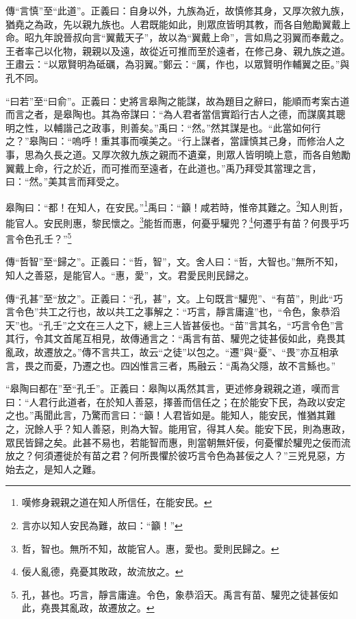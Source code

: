 {\noindent\zhuan{}\fzbyks 傳“言慎”至“此道”。正義曰：自身以外，九族為近，故慎修其身，又厚次敘九族，猶堯之為政，先以親九族也。人君既能如此，則眾庶皆明其教，而各自勉勵翼戴上命。昭九年說晉叔向言“翼戴天子”，故以為“翼戴上命”，言如鳥之羽翼而奉戴之。王者率己以化物，親親以及遠，故從近可推而至於遠者，在修己身、親九族之道。王肅云：“以眾賢明為砥礪，為羽翼。”鄭云：“厲，作也，以眾賢明作輔翼之臣。”與孔不同。 \par}

{\noindent\shu{}\fzkt “曰若”至“曰俞”。正義曰：史將言皋陶之能謀，故為題目之辭曰，能順而考案古道而言之者，是皋陶也。其為帝謀曰：“為人君者當信實蹈行古人之德，而謀廣其聰明之性，以輔諧己之政事，則善矣。”禹曰：“然。”然其謀是也。“此當如何行之？”皋陶曰：“嗚呼！重其事而嘆美之。“行上謀者，當謹慎其己身，而修治人之事，思為久長之道。又厚次敘九族之親而不遺棄，則眾人皆明曉上意，而各自勉勵翼戴上命，行之於近，而可推而至遠者，在此道也。”禹乃拜受其當理之言，曰：“然。”美其言而拜受之。 \par}

皋陶曰：“都！在知人，在安民。”\footnote{嘆修身親親之道在知人所信任，在能安民。}禹曰：“籲！咸若時，惟帝其難之。\footnote{言亦以知人安民為難，故曰：“籲！”}知人則哲，能官人。安民則惠，黎民懷之。\footnote{哲，智也。無所不知，故能官人。惠，愛也。愛則民歸之。}能哲而惠，何憂乎驩兜？\footnote{佞人亂德，堯憂其敗政，故流放之。}何遷乎有苗？何畏乎巧言令色孔壬？”\footnote{孔，甚也。巧言，靜言庸違。令色，象恭滔天。禹言有苗、驩兜之徒甚佞如此，堯畏其亂政，故遷放之。}


{\noindent\zhuan{}\fzbyks 傳“哲智”至“歸之”。正義曰：“哲，智”，文。舍人曰：“哲，大智也。”無所不知，知人之善惡，是能官人。“惠，愛”，文。君愛民則民歸之。 \par}

{\noindent\zhuan{}\fzbyks 傳“孔甚”至“放之”。正義曰：“孔，甚”，文。上句既言“驩兜”、“有苗”，則此“巧言令色”共工之行也，故以共工之事解之：“巧言，靜言庸違”也，“令色，象恭滔天”也。“孔壬”之文在三人之下，總上三人皆甚佞也。“苗”言其名，“巧言令色”言其行，令其文首尾互相見，故傳通言之：“禹言有苗、驩兜之徒甚佞如此，堯畏其亂政，故遷放之。”傳不言共工，故云“之徒”以包之。“遷”與“憂”、“畏”亦互相承言，畏之而憂，乃遷之也。四凶惟言三者，馬融云：“禹為父隱，故不言鯀也。” \par}

{\noindent\shu{}\fzkt “皋陶曰都在”至“孔壬”。正義曰：皋陶以禹然其言，更述修身親親之道，嘆而言曰：“人君行此道者，在於知人善惡，擇善而信任之；在於能安下民，為政以安定之也。”禹聞此言，乃驚而言曰：“籲！人君皆如是。能知人，能安民，惟猶其難之，況餘人乎？知人善惡，則為大智。能用官，得其人矣。能安下民，則為惠政，眾民皆歸之矣。此甚不易也，若能智而惠，則當朝無奸佞，何憂懼於驩兜之佞而流放之？何須遷徙於有苗之君？何所畏懼於彼巧言令色為甚佞之人？”三兇見惡，方始去之，是知人之難。 \par}

